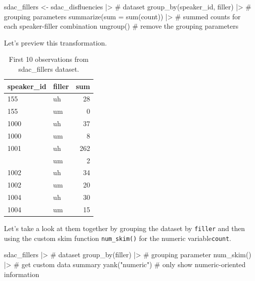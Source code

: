 \documentclass[
  letterpaper,
]{latex/krantz}
\newenvironment{Shaded}{\begin{snugshade}}{\end{snugshade}}
\newcommand{\AttributeTok}[1]{\textcolor[rgb]{0.40,0.45,0.13}{#1}}
\newcommand{\CommentTok}[1]{\textcolor[rgb]{0.37,0.37,0.37}{#1}}
\newcommand{\FunctionTok}[1]{\textcolor[rgb]{0.28,0.35,0.67}{#1}}
\newcommand{\NormalTok}[1]{\textcolor[rgb]{0.00,0.23,0.31}{#1}}
\newcommand{\OtherTok}[1]{\textcolor[rgb]{0.00,0.23,0.31}{#1}}
\newcommand{\SpecialCharTok}[1]{\textcolor[rgb]{0.37,0.37,0.37}{#1}}
\newcommand{\StringTok}[1]{\textcolor[rgb]{0.13,0.47,0.30}{#1}}
\begin{document}
\begin{Shaded}
\begin{Highlighting}[]
\NormalTok{sdac\_fillers }\OtherTok{\textless{}{-}} 
\NormalTok{  sdac\_disfluencies }\SpecialCharTok{|\textgreater{}} \CommentTok{\# dataset}
  \FunctionTok{group\_by}\NormalTok{(speaker\_id, filler) }\SpecialCharTok{|\textgreater{}} \CommentTok{\# grouping parameters}
  \FunctionTok{summarize}\NormalTok{(}\AttributeTok{sum =} \FunctionTok{sum}\NormalTok{(count)) }\SpecialCharTok{|\textgreater{}} \CommentTok{\# summed counts for each speaker{-}filler combination}
  \FunctionTok{ungroup}\NormalTok{() }\CommentTok{\# remove the grouping parameters}
\end{Highlighting}
\end{Shaded}

Let's preview this transformation.

\hypertarget{tbl-i-bi-cont-sdac-fillers-preview}{}
\begin{table}
\caption{\label{tbl-i-bi-cont-sdac-fillers-preview}First 10 observations from sdac\_fillers dataset. }\tabularnewline

\centering
\begin{tabular}{llr}
\toprule
speaker\_id & filler & sum\\
\midrule
155 & uh & 28\\
155 & um & 0\\
1000 & uh & 37\\
1000 & um & 8\\
1001 & uh & 262\\
\addlinespace
1001 & um & 2\\
1002 & uh & 34\\
1002 & um & 20\\
1004 & uh & 30\\
1004 & um & 15\\
\bottomrule
\end{tabular}
\end{table}

Let's take a look at them together by grouping the dataset by
\texttt{filler} and then using the custom skim function
\texttt{num\_skim()} for the numeric variable\texttt{count}.

\begin{Shaded}
\begin{Highlighting}[]
\NormalTok{sdac\_fillers }\SpecialCharTok{|\textgreater{}} \CommentTok{\# dataset}
  \FunctionTok{group\_by}\NormalTok{(filler) }\SpecialCharTok{|\textgreater{}} \CommentTok{\# grouping parameter}
  \FunctionTok{num\_skim}\NormalTok{() }\SpecialCharTok{|\textgreater{}} \CommentTok{\# get custom data summary}
  \FunctionTok{yank}\NormalTok{(}\StringTok{"numeric"}\NormalTok{) }\CommentTok{\# only show numeric{-}oriented information}
\end{Highlighting}
\end{Shaded}
\end{document}
